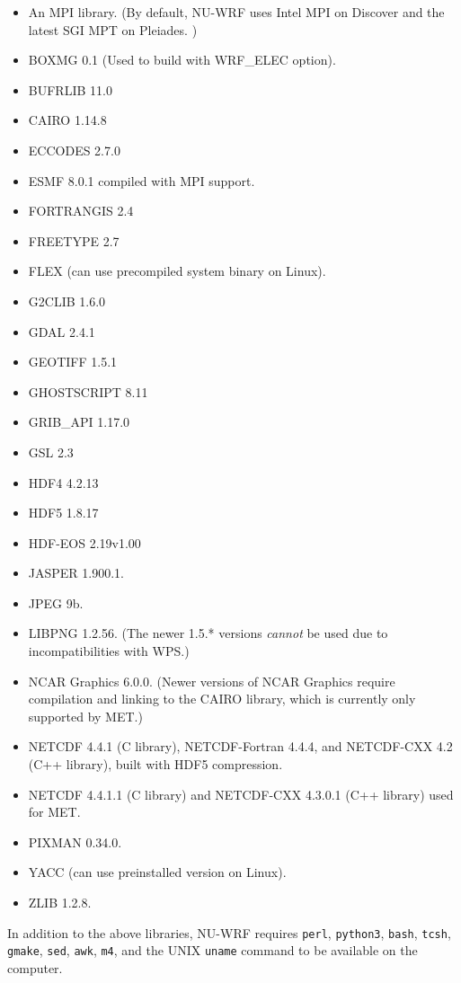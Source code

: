 \begin{itemize}
\item An MPI library. (By default, NU-WRF uses Intel MPI on Discover and
the latest SGI MPT on Pleiades. )
\item BOXMG 0.1 (Used to build with WRF\_ELEC option).
\item BUFRLIB 11.0
\item CAIRO 1.14.8
\item ECCODES 2.7.0
\item ESMF 8.0.1 compiled with MPI support.
\item FORTRANGIS 2.4
\item FREETYPE 2.7
\item FLEX (can use precompiled system binary on Linux).
\item G2CLIB 1.6.0
\item GDAL 2.4.1
\item GEOTIFF 1.5.1
\item GHOSTSCRIPT 8.11
\item GRIB\_API 1.17.0
\item GSL 2.3
\item HDF4 4.2.13
\item HDF5 1.8.17
\item HDF-EOS 2.19v1.00
\item JASPER 1.900.1.
\item JPEG 9b.
\item LIBPNG 1.2.56. (The newer 1.5.* versions \emph{cannot} be used due to 
  incompatibilities with WPS.)
\item NCAR Graphics 6.0.0. (Newer versions of NCAR Graphics require compilation
and linking to the CAIRO library, which is currently only supported by MET.)
\item NETCDF 4.4.1 (C library), NETCDF-Fortran 4.4.4, and NETCDF-CXX 4.2 
  (C++ library), built with HDF5 compression.
\item NETCDF 4.4.1.1 (C library) and NETCDF-CXX 4.3.0.1
  (C++ library) used for MET.
\item PIXMAN 0.34.0.
\item YACC (can use preinstalled version on Linux).
\item ZLIB 1.2.8.
\end{itemize}

In addition to the above libraries, NU-WRF requires \texttt{perl}, 
\texttt{python3}, \texttt{bash}, \texttt{tcsh}, \texttt{gmake}, \texttt{sed}, 
\texttt{awk}, \texttt{m4}, and the UNIX \texttt{uname} command to be available
on the computer. 

